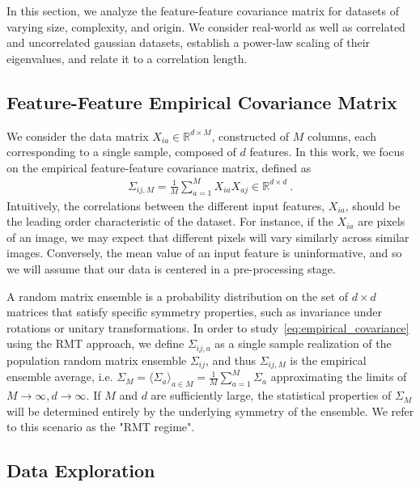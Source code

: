 \documentclass{article}
\begin{document}
In this section, we analyze the feature-feature covariance matrix for datasets of varying size, complexity, and origin. We consider real-world as well as correlated and uncorrelated gaussian datasets, establish a power-law scaling of their eigenvalues, and relate it to a correlation length.

\subsection{Feature-Feature Empirical Covariance Matrix}
\label{sec:covariance matrix}
We consider the data matrix $X_{i a} \in \mathbb{R}^{d\times M} $, constructed of $M$ columns, each corresponding to a single sample, composed of $d$ features. In this work, we focus on the empirical feature-feature covariance matrix, defined as
%
\begin{align}
\label{eq:empirical_covariance}
    \Sigma_{ij,M}=
    \frac{1}{M}\sum_{a = 1}^{M}
    X_{i a}
    X_{a j}
     \in \mathbb{R}^{d\times d} \ .
\end{align}
Intuitively, the correlations between the different input features, $X_{ia}$, should be the leading order characteristic of the dataset. For instance, if the $X_{ia}$ are pixels of an image, we may expect that different
pixels will vary similarly across similar images. Conversely, the mean value of an input feature is uninformative, and so we will assume that our data is centered in a pre-processing stage. 

A random matrix ensemble is a probability distribution on the set of $d\times d$ matrices that satisfy specific symmetry properties, such as invariance under rotations or unitary transformations.
In order to study~\cref{eq:empirical_covariance} using the RMT approach,  we define $\Sigma_{ij,a}$ as a single sample realization of the population random matrix ensemble $\Sigma_{ij}$, and thus $\Sigma_{ij,M}$ is the empirical ensemble average, i.e. $\Sigma_M = \langle \Sigma_a \rangle_{a\in M} =  \tfrac{1}{M}\sum_{a=1}^M\Sigma_a$ approximating the limits of $M \to \infty, d\to \infty$. If $M$ and $d$ are sufficiently large, the statistical properties of $\Sigma_M$ will be determined entirely by the underlying symmetry of the ensemble. We refer to this scenario as the "RMT regime".


\subsection{Data Exploration}
\label{exp}
\end{document}

